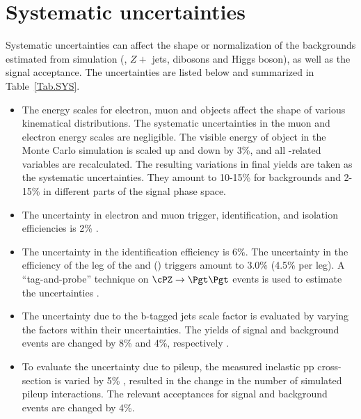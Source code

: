 \section{Systematic uncertainties}
\label{sect:sys}
Systematic uncertainties can affect the shape or normalization of the
backgrounds estimated from simulation (\ttbar, $Z+$ jets, dibosons and Higgs boson), 
as well as the signal acceptance. 
The uncertainties are listed below and summarized in Table~\ref{Tab.SYS}.


\begin{itemize}

\item  The energy scales for electron, muon and \Tau objects affect the shape of various kinematical distributions.
 The systematic uncertainties in the muon and electron energy scales are negligible.
The visible energy of \Tau object in the Monte Carlo simulation is scaled up and down
by 3\%, and all \Tau-related variables are recalculated. The resulting variations in
final yields are taken as the systematic uncertainties. They amount to 10-15\% for 
backgrounds and 2-15\% in different parts of the signal phase space.


\item The uncertainty in electron and muon trigger, identification, and
  isolation efficiencies is 2\% \cite{Khachatryan:2014wca}.

\item The uncertainty in the \Tau identification efficiency is 6\%. 
  The uncertainty in the efficiency of the \Tau leg of the \eTau and
  \muTau (\tauTau) triggers amount to 3.0\% (4.5\% per leg).
  A ``tag-and-probe'' technique on $\cPZ\to \Pgt\Pgt$ events is used to estimate the 
  uncertainties \cite{Khachatryan:2014wca}.

\item The uncertainty due to the b-tagged jets scale factor is evaluated by varying the 
factors within their uncertainties. The yields of signal and background events are changed by 8\% 
and 4\%, respectively \cite{Chatrchyan:2012jua}.
 
\item To evaluate the uncertainty due to pileup, the measured inelastic pp cross-section is
  varied by 5\% \cite{Antchev:2011vs}, resulted in the change in the number of simulated pileup interactions.
 The relevant acceptances for signal and background events are changed by 4\%.


\end{itemize}
